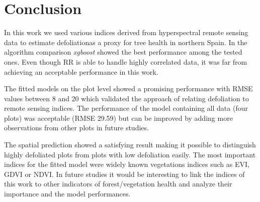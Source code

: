 \documentclass[review]{elsarticle}
\begin{document}




\section{Conclusion}

\noindent In this work we used various indices derived from hyperspectral remote sensing data to estimate defoliationas a proxy for tree health in northern Spain.
In the algorithm comparison \textit{xgboost} showed the best performance among the tested ones.
Even though \ac{RR} is able to handle highly correlated data, it was far from achieving an acceptable performance in this work.

The fitted models on the plot level showed a promising performance with RMSE values between 8 and 20 which validated the approach of relating defoliation to remote sensing indices.
The performance of the model containing all data (four plots) was acceptable (RMSE 29.59) but can be improved by adding more observations from other plots in future studies.

The spatial prediction showed a satisfying result making it possible to distinguish highly defoliated plots from plots with low defoliation easily.
The most important indices for the fitted model were widely known vegetations indices such as EVI, GDVI or NDVI.
In future studies it would be interesting to link the indices of this work to other indicators of forest/vegetation health and analyze their importance and the model performances.
\end{document}
